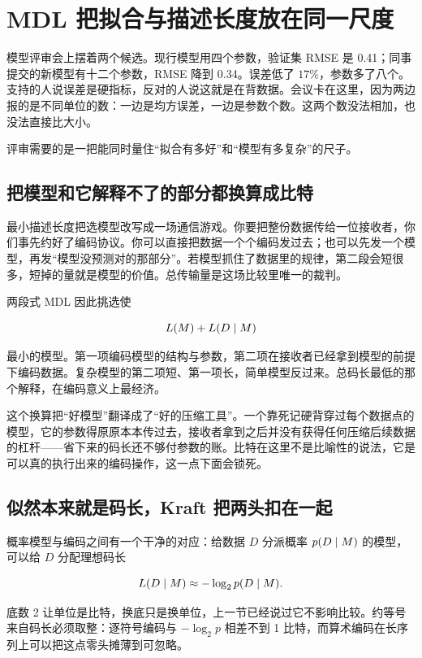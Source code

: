 \section{MDL 把拟合与描述长度放在同一尺度}
\label{sec:13-Machine-Learning/11-Information-Theoretic-Learning/03}

模型评审会上摆着两个候选。现行模型用四个参数，验证集 RMSE 是 0.41；同事提交的新模型有十二个参数，RMSE 降到 0.34。误差低了 \(17\%\)，参数多了八个。支持的人说误差是硬指标，反对的人说这就是在背数据。会议卡在这里，因为两边报的是不同单位的数：一边是均方误差，一边是参数个数。这两个数没法相加，也没法直接比大小。

评审需要的是一把能同时量住``拟合有多好''和``模型有多复杂''的尺子。

\subsection{把模型和它解释不了的部分都换算成比特}

最小描述长度把选模型改写成一场通信游戏。你要把整份数据传给一位接收者，你们事先约好了编码协议。你可以直接把数据一个个编码发过去；也可以先发一个模型，再发``模型没预测对的那部分''。若模型抓住了数据里的规律，第二段会短很多，短掉的量就是模型的价值。总传输量是这场比较里唯一的裁判。

两段式 MDL 因此挑选使

\[
L(M)+L(D\mid M)
\]

最小的模型。第一项编码模型的结构与参数，第二项在接收者已经拿到模型的前提下编码数据。复杂模型的第二项短、第一项长，简单模型反过来。总码长最低的那个解释，在编码意义上最经济。

这个换算把``好模型''翻译成了``好的压缩工具''。一个靠死记硬背穿过每个数据点的模型，它的参数得原原本本传过去，接收者拿到之后并没有获得任何压缩后续数据的杠杆——省下来的码长还不够付参数的账。比特在这里不是比喻性的说法，它是可以真的执行出来的编码操作，这一点下面会锁死。

\subsection{似然本来就是码长，Kraft 把两头扣在一起}

概率模型与编码之间有一个干净的对应：给数据 \(D\) 分派概率 \(p(D\mid M)\) 的模型，可以给 \(D\) 分配理想码长

\[
L(D\mid M)\approx-\log_2 p(D\mid M).
\]

底数 2 让单位是比特，换底只是换单位，上一节已经说过它不影响比较。约等号来自码长必须取整：逐符号编码与 \(-\log_2 p\) 相差不到 1 比特，而算术编码在长序列上可以把这点零头摊薄到可忽略。

